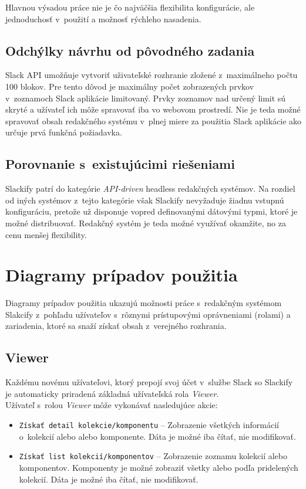 \noindent Hlavnou výsadou práce nie je čo najväčšia flexibilita konfigurácie, ale jednoduchosť v~použití a možnosť rýchleho nasadenia. 

\subsection{Odchýlky návrhu od pôvodného zadania}
Slack API umožňuje vytvoriť uživateľské rozhranie zložené z~maximálneho počtu 100 blokov. Pre tento dôvod je maximálny počet zobrazených prvkov v~zoznamoch Slack aplikácie limitovaný. Prvky zoznamov nad určený limit sú skryté a užívateľ ich môže spravovať iba vo webovom prostredí. Nie je teda možné spravovať obsah redakčného systému v~plnej miere za použitia Slack aplikácie ako určuje prvá funkčná požiadavka.

\subsection{Porovnanie s~existujúcimi riešeniami}
Slackify patrí do kategórie \emph{API-driven} headless redakčných systémov. Na rozdiel od iných systémov z~tejto kategórie však Slackify nevyžaduje žiadnu vstupnú konfiguráciu, pretože už disponuje vopred definovanými dátovými typmi, ktoré je možné distribuovať. Redakčný systém je teda možné využívať okamžite, no za cenu menšej flexibility.

\section{Diagramy prípadov použitia}
\label{design:use_case}
Diagramy prípadov použitia ukazujú možnosti práce s~redakčným systémom Slakcify z~pohľadu užívateľov s~rôznymi prístupovými oprávneniami (rolami) a zariadenia, ktoré sa snaží získať obsah z~verejného rozhrania.

\subsection{Viewer}
Každému novému užívateľovi, ktorý prepojí svoj účet v~službe Slack so Slackify je automaticky priradená základná užívateľská rola \emph{Viewer}. \\

\noindent Užívateľ s~rolou \emph{Viewer} môže vykonávať nasledujúce akcie:

\begin{itemize}
	\item \texttt{Získať detail kolekcie/komponentu} -- Zobrazenie všetkých informácií o~kolekcií alebo alebo komponente. Dáta je možné iba čítať, nie modifikovať.
	\item \texttt{Získať list kolekcií/komponentov} -- Zobrazenie zoznamu kolekcií alebo komponentov. Komponenty je možné zobraziť všetky alebo podľa pridelených kolekcií. Dáta je možné iba čítať, nie modifikovať.
\end{itemize}

